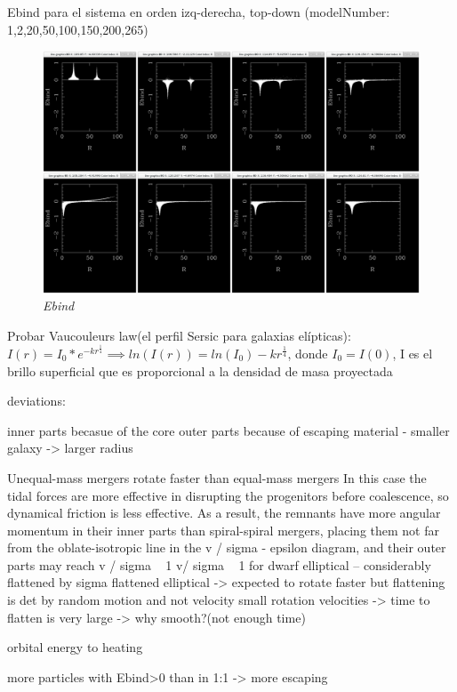 \documentclass[12pt]{book}
\begin{document}
Ebind para el sistema en orden izq-derecha, top-down (modelNumber: 1,2,20,50,100,150,200,265)
\begin{figure}[h!]
 \centering
 \includegraphics[scale=0.2]{imgConHaloEbindComb.png}
 \caption{\emph{Ebind}}
 \label{Fig: 5}
\end{figure}






Probar Vaucouleurs law(el perfil Sersic para galaxias elípticas):
$I(r) = I_0 * e^{-kr^\frac{1}{4}} \implies ln(I(r)) = ln(I_0) - kr^\frac{1}{4}$, donde $I_0 =I(0)$, I es el brillo superficial que es proporcional a la densidad de masa proyectada

deviations:

inner parts becasue of the core
outer parts because of escaping material - smaller galaxy -> larger radius


Unequal-mass mergers rotate faster than equal-mass mergers
In this case the tidal forces are more effective in disrupting the progenitors before coalescence, so dynamical friction is less effective. As a result, the remnants have more angular momentum in their inner parts than spiral-spiral mergers, placing them not far from the oblate-isotropic line in the v / sigma - epsilon diagram, and their outer parts may reach v / sigma ~ 1
v/ sigma ~ 1 for dwarf elliptical -- considerably flattened  by sigma
flattened elliptical -> expected to rotate faster but flattening is det by random motion and not velocity
small rotation velocities -> time to flatten is very large -> why smooth?(not enough time)

orbital energy to heating

more particles with Ebind>0 than in 1:1 -> more escaping
\end{document}
